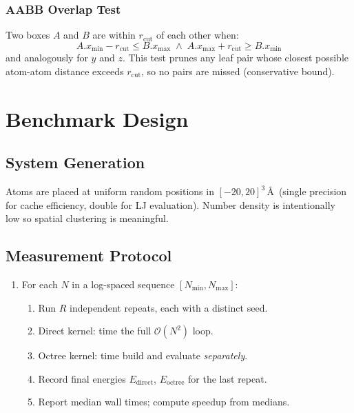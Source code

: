\documentclass[11pt,a4paper]{article}
\theoremstyle{definition}
\theoremstyle{plain}
\newcommand{\Otwo}{\mathcal{O}(N^2)}
\newcommand{\rcut}{r_{\mathrm{cut}}}
\begin{document}
\subsubsection{AABB Overlap Test}

Two boxes $A$ and $B$ are within $\rcut$ of each other when:
\begin{equation}
  A.x_{\min} - \rcut \le B.x_{\max}
  \;\wedge\; A.x_{\max} + \rcut \ge B.x_{\min}
\end{equation}
and analogously for $y$ and $z$.
This test prunes any leaf pair whose closest possible atom-atom distance
exceeds $\rcut$, so no pairs are missed (conservative bound).

\section{Benchmark Design}
\label{sec:design}

\subsection{System Generation}

Atoms are placed at uniform random positions in $[-20, 20]^3$\,\AA\ (single
precision for cache efficiency, double for LJ evaluation).  Number density
is intentionally low so spatial clustering is meaningful.

\subsection{Measurement Protocol}

\begin{enumerate}
  \item For each $N$ in a log-spaced sequence $[N_{\min}, N_{\max}]$:
  \begin{enumerate}
	\item Run $R$ independent repeats, each with a distinct seed.
	\item Direct kernel: time the full $\Otwo$ loop.
	\item Octree kernel: time build and evaluate \emph{separately}.
	\item Record final energies $E_{\mathrm{direct}}$, $E_{\mathrm{octree}}$
	  for the last repeat.
	\item Report median wall times; compute speedup from medians.
  \end{enumerate}
\end{enumerate}
\end{document}
